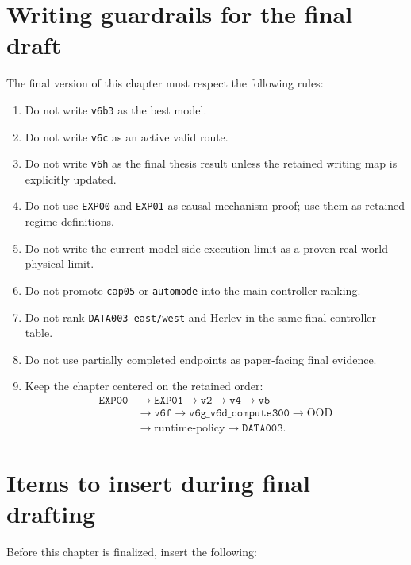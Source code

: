 \section{Writing guardrails for the final draft}
\label{sec:results-guardrails}

The final version of this chapter must respect the following rules:

\begin{enumerate}
    \item Do not write \texttt{v6b3} as the best model.
    \item Do not write \texttt{v6c} as an active valid route.
    \item Do not write \texttt{v6h} as the final thesis result unless the retained writing map is explicitly updated.
    \item Do not use \texttt{EXP00} and \texttt{EXP01} as causal mechanism proof; use them as retained regime definitions.
    \item Do not write the current model-side execution limit as a proven real-world physical limit.
    \item Do not promote \texttt{cap05} or \texttt{automode} into the main controller ranking.
    \item Do not rank \texttt{DATA003 east/west} and Herlev in the same final-controller table.
    \item Do not use partially completed endpoints as paper-facing final evidence.
    \item Keep the chapter centered on the retained order:
    \[
    \begin{aligned}
    \texttt{EXP00} &\rightarrow \texttt{EXP01} \rightarrow \texttt{v2} \rightarrow \texttt{v4} \rightarrow \texttt{v5} \\
    &\rightarrow \texttt{v6f} \rightarrow \texttt{v6g\_v6d\_compute300} \rightarrow \text{OOD} \\
    &\rightarrow \text{runtime-policy} \rightarrow \texttt{DATA003}.
    \end{aligned}
    \]
\end{enumerate}

\section{Items to insert during final drafting}
\label{sec:results-todo}

Before this chapter is finalized, insert the following:

